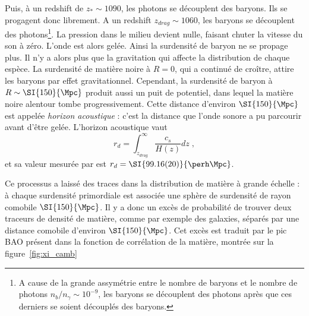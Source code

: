 Puis, à un redshift de $z_{\ast} \sim 1090$, les photons se découplent des baryons. Ils se progagent donc librement.
A un redshift $z_{drag} \sim 1060$, les baryons se découplent des photons\footnote{A cause de la grande assymétrie entre le nombre de baryons et le nombre de photons $n_{b} / n_{\gamma} \sim 10^{-9}$, les baryons se découplent des photons après que ces derniers se soient découplés des baryons.}. La pression dans le milieu devient nulle, faisant chuter la vitesse du son à zéro. L'onde est alors gelée. Ainsi la surdensité de baryon ne se propage plus. Il n'y a alors plus que la gravitation qui affecte la distribution de chaque espèce.
La surdensité de matière noire à $R = 0$, qui a continué de croître, attire les baryons par effet gravitationnel. Cependant, la surdensité de baryon à $R \sim \SI{150}{\Mpc}$ produit aussi un puit de potentiel, dans lequel la matière noire alentour tombe progressivement.
Cette distance d'environ $\SI{150}{\Mpc}$ est appelée \emph{horizon acoustique} : c'est la distance que l'onde sonore a pu parcourir avant d'être gelée. L'horizon acoustique vaut
\begin{equation}
  \label{eq:sound_horizon}
  r_{d} = \int^{\infty}_{z_{drag}} \frac{c_{s}}{H(z)} dz  \; ,
\end{equation}
et sa valeur mesurée par \textcite{Collaboration2018} est $r_{d} = \SI{99.16(20)}{\perh\Mpc}$.

Ce processus a laissé des traces dans la distribution de matière à grande échelle : à chaque surdensité primordiale est associée une sphère de surdensité de rayon comobile $\SI{150}{\Mpc}$.
Il y a donc un excès de probabilité de trouver deux traceurs de densité de matière, comme par exemple des galaxies, séparés par une distance  comobile d'environ $\SI{150}{\Mpc}$.
Cet excès est traduit par le pic BAO présent dans la fonction de corrélation de la matière, montrée sur la figure~\ref{fig:xi_camb}


